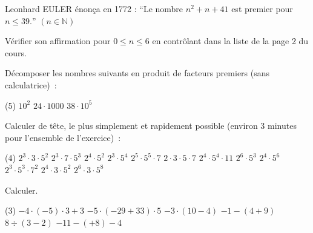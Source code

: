 \documentclass[a4paper,12pt]{report}
\begin{document}
\begin{exo}
Leonhard EULER énonça en 1772 :
\enquote{Le nombre $n^2+n+41$ est premier pour $n \leq 39.$} $(n \in \mathbb{N})$

Vérifier son affirmation pour $0 \leq n \leq 6$ en contrôlant dans la liste de la page 2 du cours.
\end{exo}

\begin{exo}
Décomposer les nombres suivants en produit de facteurs premiers (sans calculatrice)~:
\begin{tasks}(5)
\task $10^2$
\task $24 \cdot 1000$
\task $38 \cdot 10^5$
\end{tasks}
\end{exo}
\begin{exo}
Calculer de tête, le plus simplement et rapidement possible (environ 3 minutes pour l'ensemble de l'exercice)~:
\begin{tasks}(4)
\task $2^3 \cdot 3 \cdot 5^2$
\task $2^3 \cdot 7 \cdot 5^3$
\task $2^4 \cdot 5^2$
\task $2^3 \cdot 5^4$
\task $2^5 \cdot 5^5 \cdot 7$
\task $2 \cdot 3 \cdot 5 \cdot 7$
\task $2^4 \cdot 5^4 \cdot 11$
\task $2^6 \cdot 5^3$
\task $2^4 \cdot 5^6$
\task $2^3 \cdot 5^3 \cdot 7^2$
\task $2^4 \cdot 3 \cdot 5^2$
\task $2^6 \cdot 3 \cdot 5^8$
\end{tasks}
\end{exo}




\begin{auto}Calculer.

\begin{tasks}(3)
	\task $-4\cdot(-5)\cdot3+3$
	\task $-5\cdot(-29+33)\cdot5$
	\task $-3\cdot(10-4)$
	\task $-1-(4+9)$
	\task $8\div(3-2)$
	\task $-11-(+8)-4$
\end{tasks}

\end{auto}
\end{document}
